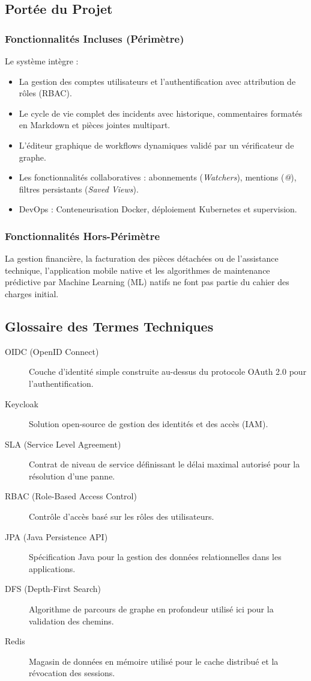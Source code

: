 \documentclass[12pt,a4paper]{article}
\begin{document}
\subsection{Portée du Projet}
\subsubsection{Fonctionnalités Incluses (Périmètre)}
Le système intègre :
\begin{itemize}
    \item La gestion des comptes utilisateurs et l'authentification avec attribution de rôles (RBAC).
    \item Le cycle de vie complet des incidents avec historique, commentaires formatés en Markdown et pièces jointes multipart.
    \item L'éditeur graphique de workflows dynamiques validé par un vérificateur de graphe.
    \item Les fonctionnalités collaboratives : abonnements (\textit{Watchers}), mentions (\textit{@}), filtres persistants (\textit{Saved Views}).
    \item DevOps : Conteneurisation Docker, déploiement Kubernetes et supervision.
\end{itemize}
\subsubsection{Fonctionnalités Hors-Périmètre}
La gestion financière, la facturation des pièces détachées ou de l'assistance technique, l'application mobile native et les algorithmes de maintenance prédictive par Machine Learning (ML) natifs ne font pas partie du cahier des charges initial.

\subsection{Glossaire des Termes Techniques}
\begin{description}
    \item[OIDC (OpenID Connect)] Couche d'identité simple construite au-dessus du protocole OAuth 2.0 pour l'authentification.
    \item[Keycloak] Solution open-source de gestion des identités et des accès (IAM).
    \item[SLA (Service Level Agreement)] Contrat de niveau de service définissant le délai maximal autorisé pour la résolution d'une panne.
    \item[RBAC (Role-Based Access Control)] Contrôle d'accès basé sur les rôles des utilisateurs.
    \item[JPA (Java Persistence API)] Spécification Java pour la gestion des données relationnelles dans les applications.
    \item[DFS (Depth-First Search)] Algorithme de parcours de graphe en profondeur utilisé ici pour la validation des chemins.
    \item[Redis] Magasin de données en mémoire utilisé pour le cache distribué et la révocation des sessions.
\end{description}
\end{document}
